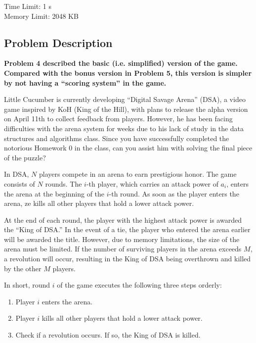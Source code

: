 \providecommand{\tightlist}{\setlength{\itemsep}{0pt}\setlength{\parskip}{0pt}}
\setcounter{secnumdepth}{0}

Time Limit: 1 s \\
Memory Limit: 2048 KB
\vspace{-15pt}

\subsection{Problem Description}\label{problem-description}

\textbf{Problem 4 described the basic (i.e. simplified) version of the game. Compared with the bonus version in Problem 5, this version is simpler by not having a ``scoring system'' in the game.}
\vspace{6pt}

Little Cucumber is currently developing ``Digital Savage Arena'' (DSA), a video game inspired by KoH (King of the Hill), with plans to release the alpha version on April 11th to collect feedback from players. However, he has been facing difficulties with the arena system for weeks due to his lack of study in the data structures and algorithms class. Since you have successfully completed the notorious Homework 0 in the class, can you assist him with solving the final piece of the puzzle?

In DSA, $N$ players compete in an arena to earn prestigious honor. The game consists of $N$ rounds. The $i$-th player, which carries an attack power of $a_i$, enters the arena at the beginning of the $i$-th round. As soon as the player enters the arena, ze kills all other players that hold a lower attack power.

At the end of each round, the player with the highest attack power is awarded the ``King of DSA.'' In the event of a tie, the player who entered the arena earlier will be awarded the title. However, due to memory limitations, the size of the arena must be limited. If the number of surviving players in the arena exceeds $M$, a revolution will occur, resulting in the King of DSA being overthrown and killed by the other $M$ players.

In short, round $i$ of the game executes the following three steps orderly:
\vspace{-6pt}
\begin{enumerate}[leftmargin=50pt]
\tightlist
    \item Player $i$ enters the arena.
    \item Player $i$ kills all other players that hold a lower attack power.
    \item Check if a revolution occurs. If so, the King of DSA is killed.
\end{enumerate}

